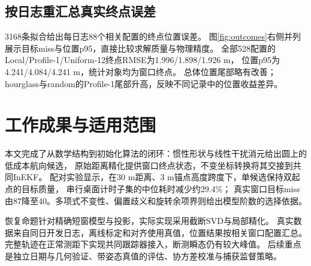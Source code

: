 \documentclass[11pt,a4paper]{ctexart}
\begin{document}
\subsection{按日志重汇总真实终点误差}
3168条拟合给出每日志88个相关配置的终点位置误差。
图\ref{fig:outcomes}右侧并列展示目标miss与位置p95，直接比较求解质量与物理精度。
全部528配置的Local/Profile-1/Uniform-12终点RMSE为1.996/1.898/1.926 m，
位置p95为4.241/4.084/4.241 m，统计对象均为窗口终点。
总体位置尾部略有改善；hourglass与random的Profile-1尾部升高，反映不同记录中的位置收益差异。

\section{工作成果与适用范围}
本文完成了从数学结构到初始化算法的闭环：惯性形状与线性干扰消元给出圆上的低成本航向候选，
原始距离精化提供窗口终点状态，不变坐标转换将其交接到共同InEKF。
配对实验显示，在30 m距离、3 m锚点高度跨度下，单候选保持双起点的目标质量，
串行桌面计时子集的中位耗时减少约29.4\%；
真实窗口目标miss由87降至40。多项式不变性、偏置歧义和旋转余项界则给出模型阶数的选择依据。

恢复命题针对精确短窗模型与投影，实际实现采用截断SVD与局部精化。
真实数据来自同日开发日志，离线标定和对齐使用真值，位置结果按相关窗口配置汇总。
完整轨迹在正常测距下实现共同跟踪器接入，断测瞬态仍有较大峰值。
后续重点是独立日期与几何验证、带姿态真值的评估、协方差校准与捕获监督策略。
\end{document}
